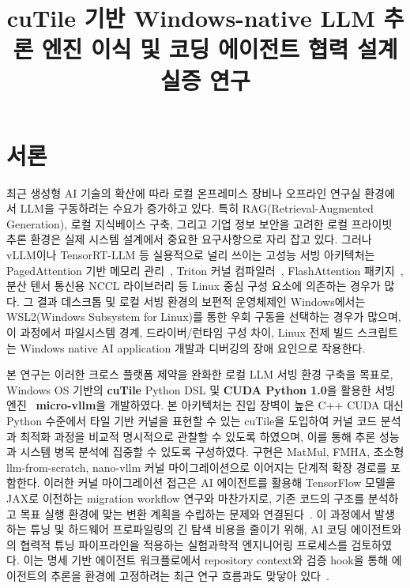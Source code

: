 \documentclass{kcc}            %
\title{cuTile 기반 Windows-native LLM 추론 엔진 이식 및 코딩 에이전트 협력 설계 실증 연구}
\author{}
\begin{document}
\maketitle

\section{서론}
최근 생성형 AI 기술의 확산에 따라 로컬 온프레미스 장비나 오프라인 연구실
환경에서 LLM을 구동하려는 수요가 증가하고 있다. 특히
RAG(Retrieval-Augmented Generation), 로컬 지식베이스 구축, 그리고 기업
정보 보안을 고려한 로컬 프라이빗 추론 환경은 실제 시스템 설계에서 중요한
요구사항으로 자리 잡고 있다. 그러나 vLLM이나 TensorRT-LLM 등 실용적으로
널리 쓰이는 고성능 서빙 아키텍처는 PagedAttention 기반 메모리 관리~\cite{pagedattention},
Triton 커널 컴파일러~\cite{triton}, FlashAttention 패키지~\cite{flashattention}, 분산 텐서 통신용 NCCL
라이브러리 등 Linux 중심 구성 요소에 의존하는 경우가 많다. 그 결과
데스크톱 및 로컬 서빙 환경의 보편적 운영체제인 Windows에서는
WSL2(Windows Subsystem for Linux)를 통한 우회 구동을 선택하는 경우가
많으며, 이 과정에서 파일시스템 경계, 드라이버/런타임 구성 차이, Linux
전제 빌드 스크립트는 Windows native AI application 개발과 디버깅의 장애
요인으로 작용한다.

본 연구는 이러한 크로스 플랫폼 제약을 완화한 로컬 LLM 서빙 환경 구축을
목표로, Windows OS 기반의 \textbf{cuTile} Python DSL 및
\textbf{CUDA Python 1.0}을 활용한 서빙 엔진~\cite{nvidia-cuda133,nvidia-cutile}
\textbf{micro-vllm}을 개발하였다. 본 아키텍처는 진입 장벽이 높은 C++
CUDA 대신 Python 수준에서 타일 기반 커널을 표현할 수 있는 cuTile을
도입하여 커널 코드 분석과 최적화 과정을 비교적 명시적으로 관찰할 수
있도록 하였으며, 이를 통해 추론 성능과 시스템 병목 분석에 집중할 수
있도록 구성하였다. 구현은 MatMul, FMHA, 초소형 llm-from-scratch,
nano-vllm 커널 마이그레이션으로 이어지는 단계적 확장 경로를 포함한다.
이러한 커널 마이그레이션 접근은 AI 에이전트를 활용해 TensorFlow 모델을
JAX로 이전하는 migration workflow 연구와 마찬가지로, 기존 코드의 구조를
분석하고 목표 실행 환경에 맞는 변환 계획을 수립하는 문제와 연결된다~\cite{ai-migration}.
이 과정에서 발생하는 튜닝 및 하드웨어 프로파일링의 긴 탐색 비용을 줄이기
위해, AI 코딩 에이전트와의 협력적 튜닝 파이프라인을 적용하는
실험과학적 엔지니어링 프로세스를 검토하였다. 이는 명세 기반 에이전트
워크플로에서 repository context와 검증 hook을 통해 에이전트의 추론을
환경에 고정하려는 최근 연구 흐름과도 맞닿아 있다~\cite{speckit}.
\end{document}
